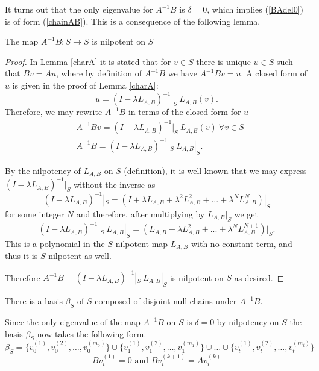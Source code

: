 It turns out that the only eigenvalue for $A^{-1}B$ is $\delta=0$, which implies (\ref{BAdel0}) is of form (\ref{chainAB}).
This is a consequence of the following lemma.

\begin{lemma}
    The map $A^{-1}B:S\rightarrow S$ is nilpotent on $S$
\end{lemma}

\begin{proof}
    In Lemma \ref{charA} it is stated that for $v\in S$ there is unique $u\in S$ such that $Bv=Au$, where by definition of $A^{-1}B$ we have $A^{-1}Bv=u$. A closed form of $u$ is given in the proof of Lemma \ref{charA}:$$u=(I-\lambda L_{A,B})^{-1}|_S\ L_{A,B} (v).$$
    Therefore, we may rewrite $A^{-1}B$ in terms of the closed form for $u$
    \begin{align*}
    &A^{-1}Bv=(I-\lambda L_{A,B})^{-1}|_S\ L_{A,B} (v)\ \forall v\in S \\
    &A^{-1}B=(I-\lambda L_{A,B})^{-1}|_S\ L_{A,B}|_S.
    \end{align*}

    By the nilpotency of \(L_{A,B}\) on $S$ (definition), it is well known that we may express $(I-\lambda L_{A,B})^{-1}|_S$ without the inverse as
    $$(I-\lambda L_{A,B})^{-1}|_S=(I+\lambda L_{A,B}+\lambda^2 L_{A,B}^2+...+\lambda ^{N}L_{A,B}^{N})|_S$$for some integer $N$ and therefore, after multiplying by $L_{A,B}|_S$ we get $$(I-\lambda L_{A,B})^{-1}|_S\ L_{A,B}|_S=(L_{A,B}+\lambda L_{A,B}^2+...+\lambda ^{N}L_{A,B}^{N+1})|_S.$$This is a polynomial in the $S$-nilpotent map $L_{A,B}$ with no constant term, and thus it is $S$-nilpotent as well.

    Therefore $A^{-1}B=(I-\lambda L_{A,B})^{-1}|_S\ L_{A,B}|_S$ is nilpotent on $S$ as desired.


    \end{proof}
\newpage
    \begin{corollary}\label{betterform}
        There is a basis $\beta_S$ of $S$ composed of disjoint null-chains under $A^{-1}B.$

    \end{corollary}
    Since the only eigenvalue of the map $A^{-1}B$ on $S$ is $\delta=0$ by nilpotency on \(S\) the basis $\beta_S$ now takes the following form.
    \begin{equation}\label{BAdel2}
    \beta_S=\{v_{0}^{(1)},v_{0}^{(2)},\dots,v_{0}^{(m_0)}\} \cup \{v_{1}^{(1)},v_{1}^{(2)},\dots,v_{1}^{(m_1)}\} \cup \dots \cup \{v_{t}^{(1)},v_{t}^{(2)},\dots,v_{t}^{(m_t)}\}
 \end{equation}
\begin{equation}
   Bv_{i}^{(1)}=0 \text{ and } Bv_{i}^{(k+1)}=Av_{i}^{(k)}
\end{equation}

